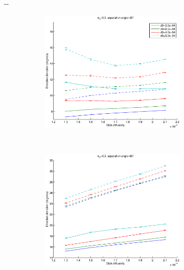 \documentclass{article}
\begin{document}
\begin{figure}[H]
  \begin{adjustwidth}{-\oddsidemargin}{-\rightmargin}
    \begin{subfigure}{0.8\paperwidth}
      \begin{subfigure}{0.3\textwidth}
        \centering
        \includegraphics[width=\textwidth]{figures/synth_modbas_diffus__snr=20__w1=3__angle=30.eps}
      \end{subfigure}
      ~
      \begin{subfigure}{0.3\textwidth}
        \centering
        \includegraphics[width=\textwidth]{figures/synth_modbas_diffus__snr=20__w1=3__angle=60.eps}

\end{subfigure}
\end{subfigure}
\end{adjustwidth}
\end{figure}
\end{document}
